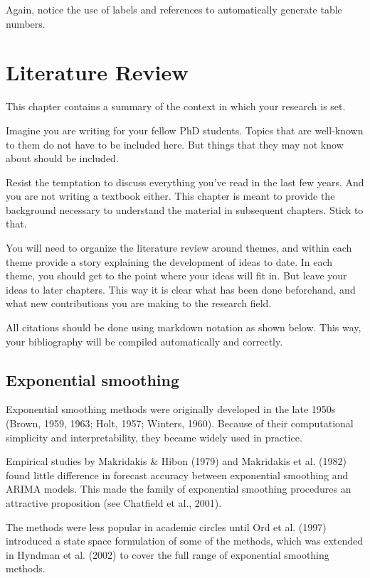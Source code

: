 \documentclass{uniexeterthesis}
\begin{document}
Again, notice the use of labels and references to automatically generate
table numbers.


\hypertarget{sec-litreview}{%
\chapter{Literature Review}\label{sec-litreview}}

This chapter contains a summary of the context in which your research is
set.

Imagine you are writing for your fellow PhD students. Topics that are
well-known to them do not have to be included here. But things that they
may not know about should be included.

Resist the temptation to discuss everything you've read in the last few
years. And you are not writing a textbook either. This chapter is meant
to provide the background necessary to understand the material in
subsequent chapters. Stick to that.

You will need to organize the literature review around themes, and
within each theme provide a story explaining the development of ideas to
date. In each theme, you should get to the point where your ideas will
fit in. But leave your ideas to later chapters. This way it is clear
what has been done beforehand, and what new contributions you are making
to the research field.

All citations should be done using markdown notation as shown below.
This way, your bibliography will be compiled automatically and
correctly.

\hypertarget{sec-expsmooth}{%
\section{Exponential smoothing}\label{sec-expsmooth}}

Exponential smoothing methods were originally developed in the late
1950s (Brown, 1959, 1963; Holt, 1957; Winters, 1960). Because of their
computational simplicity and interpretability, they became widely used
in practice.

Empirical studies by Makridakis \& Hibon (1979) and Makridakis et al.
(1982) found little difference in forecast accuracy between exponential
smoothing and ARIMA models. This made the family of exponential
smoothing procedures an attractive proposition (see Chatfield et al.,
2001).

The methods were less popular in academic circles until Ord et al.
(1997) introduced a state space formulation of some of the methods,
which was extended in Hyndman et al. (2002) to cover the full range of
exponential smoothing methods.
\end{document}

